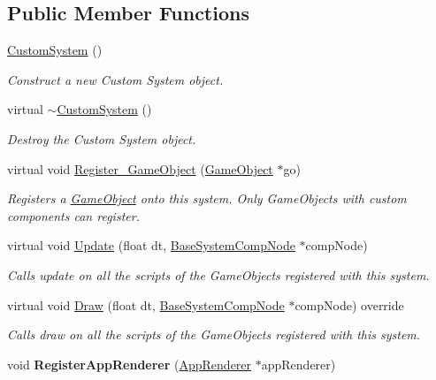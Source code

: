\subsection*{Public Member Functions}
\begin{DoxyCompactItemize}
\item 
\mbox{\label{classCustomSystem_a452aafe02e3b43713a732d2457c271c4}} 
\hyperlink{classCustomSystem_a452aafe02e3b43713a732d2457c271c4}{Custom\+System} ()
\begin{DoxyCompactList}\small\item\em Construct a new Custom System object. \end{DoxyCompactList}\item 
\mbox{\label{classCustomSystem_a7426abb7e961d7eb28ead6af07f751cd}} 
virtual \hyperlink{classCustomSystem_a7426abb7e961d7eb28ead6af07f751cd}{$\sim$\+Custom\+System} ()
\begin{DoxyCompactList}\small\item\em Destroy the Custom System object. \end{DoxyCompactList}\item 
virtual void \hyperlink{classCustomSystem_a1fe5c399dec16f2a8aff1a5c9e06760e}{Register\+\_\+\+Game\+Object} (\hyperlink{classGameObject}{Game\+Object} $\ast$go)
\begin{DoxyCompactList}\small\item\em Registers a \hyperlink{classGameObject}{Game\+Object} onto this system. Only Game\+Objects with custom components can register. \end{DoxyCompactList}\item 
virtual void \hyperlink{classCustomSystem_ab8b072ffd6b4de7404b385068d735c61}{Update} (float dt, \hyperlink{structBaseSystemCompNode}{Base\+System\+Comp\+Node} $\ast$comp\+Node)
\begin{DoxyCompactList}\small\item\em Calls update on all the scripts of the Game\+Objects registered with this system. \end{DoxyCompactList}\item 
virtual void \hyperlink{classCustomSystem_a6552a2339d179ca963650e94ee1bf615}{Draw} (float dt, \hyperlink{structBaseSystemCompNode}{Base\+System\+Comp\+Node} $\ast$comp\+Node) override
\begin{DoxyCompactList}\small\item\em Calls draw on all the scripts of the Game\+Objects registered with this system. \end{DoxyCompactList}\item 
\mbox{\label{classCustomSystem_aee254ef81ede23cbbfc18ade88d9dcc5}} 
void {\bfseries Register\+App\+Renderer} (\hyperlink{classAppRenderer}{App\+Renderer} $\ast$app\+Renderer)
\end{DoxyCompactItemize}
